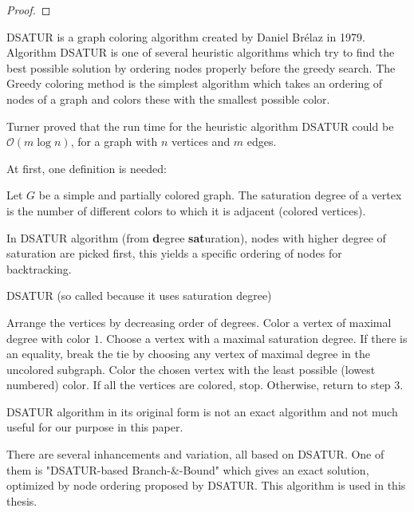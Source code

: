 \documentclass{beamer}
\begin{document}
{\begin{defi}
\begin{proof}
\end{proof}


DSATUR is a graph coloring algorithm created by Daniel Br\'elaz \cite{brelaz} in 1979. Algorithm DSATUR is one of several heuristic algorithms which try to find the best possible solution by ordering nodes properly before the greedy search. The Greedy coloring method is the simplest algorithm which takes an ordering of nodes of a graph and colors these with the smallest possible color. 

Turner \cite{turner} proved that the run time for the heuristic algorithm DSATUR could be $\mathcal{O}(m \log n)$, for a graph with $n$ vertices and $m$ edges.

At first, one definition is needed:

\begin{defi}
Let $G$ be a simple and partially colored graph. The saturation degree of a vertex is the number of different colors to which it is adjacent (colored vertices).\cite{brelaz}
\end{defi}

In DSATUR algorithm (from {\bf d}egree {\bf sat}uration), nodes with higher degree of saturation are picked first, this yields a specific ordering of nodes for backtracking.

\vspace{1cm}

\begin{algorithm}[H]
\SetAlgoLined
\DontPrintSemicolon
  \caption{DSATUR (so called because it uses saturation degree)\cite{brelaz}}

  Arrange the vertices by decreasing order of degrees.\;
   Color a vertex of maximal degree with color $1$.\;
  Choose a vertex with a maximal saturation degree. If there is an
equality, break the tie by choosing any vertex of maximal degree in the uncolored
subgraph.\;
    Color the chosen vertex with the least possible (lowest numbered)
color.\;
  If all the vertices are colored, stop. Otherwise, return to step 3.\;
 
\end{algorithm}

\newpage

DSATUR algorithm in its original form is not an exact algorithm and not much useful for our purpose in this paper. 

There are several inhancements and variation, all based on DSATUR. One of them is "DSATUR-based Branch-$\&$-Bound" which gives an exact solution, optimized by node ordering proposed by DSATUR. This algorithm is used in this thesis.


\end{defi}}
\end{document}
